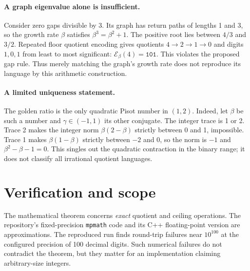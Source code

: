 \documentclass[11pt]{article}
\theoremstyle{definition}\newtheorem{definition}[theorem]{Definition}
\newcommand{\E}{\mathcal E}
\begin{document}
\paragraph{A graph eigenvalue alone is insufficient.}
Consider zero gaps divisible by 3. Its graph has return paths of lengths
1 and 3, so the growth rate $\beta$ satisfies $\beta^3=\beta^2+1$.
The positive root lies between $4/3$ and $3/2$. Repeated floor quotient
encoding gives quotients $4\to2\to1\to0$ and digits $1,0,1$ from least
to most significant: $\E_\beta(4)=\texttt{101}$. This violates the
proposed gap rule. Thus merely matching the graph's growth rate does
not reproduce its language by this arithmetic construction.

\paragraph{A limited uniqueness statement.}
The golden ratio is the only quadratic Pisot number in $(1,2)$.
Indeed, let $\beta$ be such a number and $\gamma\in(-1,1)$ its other
conjugate. The integer trace is 1 or 2. Trace 2 makes the integer norm
$\beta(2-\beta)$ strictly between 0 and 1, impossible. Trace 1 makes
$\beta(1-\beta)$ strictly between $-2$ and 0, so the norm is $-1$ and
$\beta^2-\beta-1=0$. This singles out the quadratic contraction in the
binary range; it does not classify all irrational quotient languages.

\clearpage
\section{Verification and scope}
The mathematical theorem concerns \emph{exact} quotient and ceiling
operations. The repository's fixed-precision \texttt{mpmath} code and
its C++ floating-point version are approximations. The reproduced run
finds round-trip failures near $10^{100}$ at the configured precision
of 100 decimal digits. Such numerical failures do not contradict the
theorem, but they matter for an implementation claiming arbitrary-size
integers.
\end{document}
